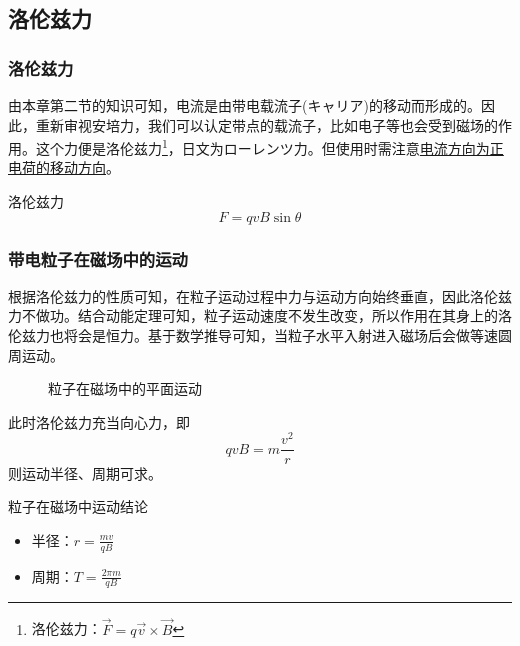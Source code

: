 \subsection{洛伦兹力}

\subsubsection{洛伦兹力}

由本章第二节的知识可知，电流是由带电载流子(キャリア)的移动而形成的。因此，重新审视安培力，我们可以认定带点的载流子，比如电子等也会受到磁场的作用。这个力便是洛伦兹力\footnote{洛伦兹力：$\vec{F}=q\vec{v}\times\vec{B}$}，日文为ローレンツ力。但使用时需注意\underline{电流方向为正电荷的移动方向}。
\begin{itembox}[l]{洛伦兹力}
    \begin{equation*}
        F=qvB\sin\theta
    \end{equation*}
\end{itembox}

\subsubsection{带电粒子在磁场中的运动}

根据洛伦兹力的性质可知，在粒子运动过程中力与运动方向始终垂直，因此洛伦兹力不做功。结合动能定理可知，粒子运动速度不发生改变，所以作用在其身上的洛伦兹力也将会是恒力。基于数学推导可知，当粒子水平入射进入磁场后会做等速圆周运动。
\begin{figure}[ht!]
    \centering
    \caption{粒子在磁场中的平面运动}
\end{figure}

此时洛伦兹力充当向心力，即
\begin{equation*}
    qvB=m\frac{v^2}{r}
\end{equation*}
则运动半径、周期可求。
\begin{itembox}[l]{粒子在磁场中运动结论}
    \begin{itemize}
        \item 半径：$r=\frac{mv}{qB}$
        \item 周期：$T=\frac{2\pi m}{qB}$
    \end{itemize}
\end{itembox}

